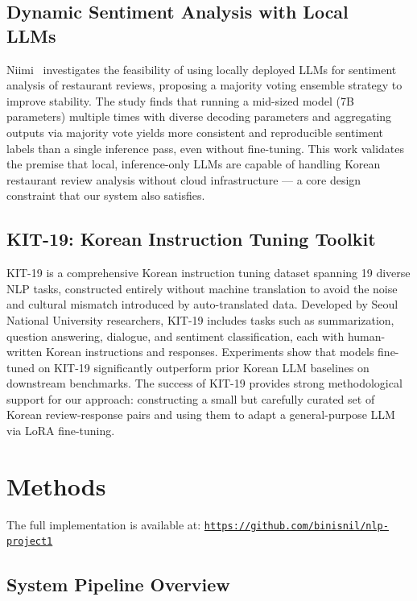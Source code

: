 \documentclass[conference]{IEEEtran}
\begin{document}
\subsection{Dynamic Sentiment Analysis with Local LLMs~\cite{niimi2024}}
Niimi~\cite{niimi2024} investigates the feasibility of using locally
deployed LLMs for sentiment analysis of restaurant reviews, proposing a
majority voting ensemble strategy to improve stability.
The study finds that running a mid-sized model (7B parameters) multiple
times with diverse decoding parameters and aggregating outputs via
majority vote yields more consistent and reproducible sentiment labels
than a single inference pass, even without fine-tuning.
This work validates the premise that local, inference-only LLMs are
capable of handling Korean restaurant review analysis without cloud
infrastructure — a core design constraint that our system also
satisfies.

\subsection{KIT-19: Korean Instruction Tuning Toolkit~\cite{kit19_2024}}
KIT-19 is a comprehensive Korean instruction tuning dataset spanning 19
diverse NLP tasks, constructed entirely without machine translation to
avoid the noise and cultural mismatch introduced by auto-translated
data.
Developed by Seoul National University researchers, KIT-19 includes
tasks such as summarization, question answering, dialogue, and sentiment
classification, each with human-written Korean instructions and
responses.
Experiments show that models fine-tuned on KIT-19 significantly
outperform prior Korean LLM baselines on downstream benchmarks.
The success of KIT-19 provides strong methodological support for our
approach: constructing a small but carefully curated set of Korean
review-response pairs and using them to adapt a general-purpose LLM
via LoRA fine-tuning.

\section{Methods}

The full implementation is available at:
\href{https://github.com/binisnil/nlp-project1}{\texttt{https://github.com/binisnil/nlp-project1}}

\subsection{System Pipeline Overview}
\end{document}
